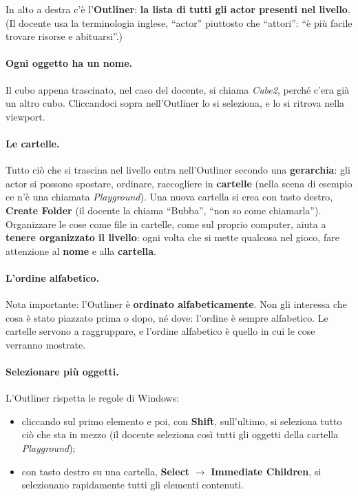 

In alto a destra c'è l'\textbf{Outliner}: \textbf{la lista di tutti gli actor
presenti nel livello}. (Il docente usa la terminologia inglese, ``actor''
piuttosto che ``attori'': ``è più facile trovare risorse e abituarsi''.)

\paragraph{Ogni oggetto ha un nome.} Il cubo appena trascinato, nel caso del
docente, si chiama \emph{Cube2}, perché c'era già un altro cubo. Cliccandoci
sopra nell'Outliner lo si seleziona, e lo si ritrova nella viewport.

\paragraph{Le cartelle.} Tutto ciò che si trascina nel livello entra
nell'Outliner secondo una \textbf{gerarchia}: gli actor si possono spostare,
ordinare, raccogliere in \textbf{cartelle} (nella scena di esempio ce n'è una
chiamata \emph{Playground}). Una nuova cartella si crea con tasto destro,
\textbf{Create Folder} (il docente la chiama ``Bubba'', ``non so come
chiamarla''). Organizzare le cose come file in cartelle, come sul proprio
computer, aiuta a \textbf{tenere organizzato il livello}: ogni volta che si
mette qualcosa nel gioco, fare attenzione al \textbf{nome} e alla
\textbf{cartella}.

\paragraph{L'ordine alfabetico.} Nota importante: l'Outliner è
\textbf{ordinato alfabeticamente}. Non gli interessa che cosa è stato piazzato
prima o dopo, né dove: l'ordine è sempre alfabetico. Le cartelle servono a
raggruppare, e l'ordine alfabetico è quello in cui le cose verranno mostrate.

\paragraph{Selezionare più oggetti.} L'Outliner rispetta le regole di
Windows:
\begin{itemize}
  \item cliccando sul primo elemento e poi, con \textbf{Shift}, sull'ultimo,
        si seleziona tutto ciò che sta in mezzo (il docente seleziona così
        tutti gli oggetti della cartella \emph{Playground});
  \item con tasto destro su una cartella, \textbf{Select} $\rightarrow$
        \textbf{Immediate Children}, si selezionano rapidamente tutti gli
        elementi contenuti.
\end{itemize}

